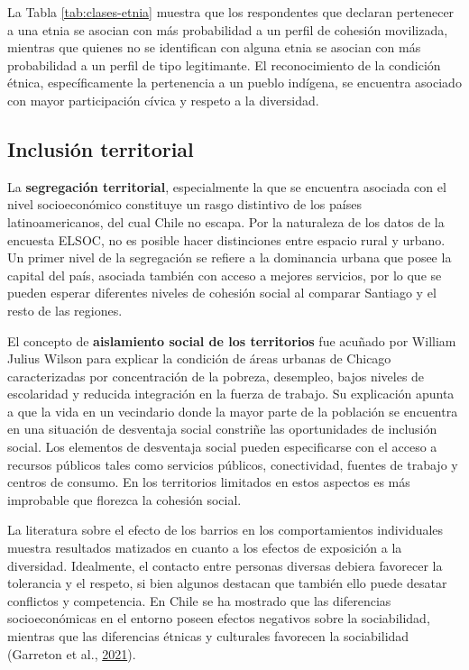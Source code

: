 \documentclass[
  12pt,
]{book}
\begin{document}
La Tabla \ref{tab:clases-etnia} muestra que los respondentes que declaran pertenecer a una etnia se asocian con más probabilidad a un perfil de cohesión movilizada, mientras que quienes no se identifican con alguna etnia se asocian con más probabilidad a un perfil de tipo legitimante. El reconocimiento de la condición étnica, específicamente la pertenencia a un pueblo indígena, se encuentra asociado con mayor participación cívica y respeto a la diversidad.

\hypertarget{inclusiuxf3n-territorial}{%
\subsection{Inclusión territorial}\label{inclusiuxf3n-territorial}}

La \textbf{segregación territorial}, especialmente la que se encuentra asociada con el nivel socioeconómico constituye un rasgo distintivo de los países latinoamericanos, del cual Chile no escapa. Por la naturaleza de los datos de la encuesta ELSOC, no es posible hacer distinciones entre espacio rural y urbano. Un primer nivel de la segregación se refiere a la dominancia urbana que posee la capital del país, asociada también con acceso a mejores servicios, por lo que se pueden esperar diferentes niveles de cohesión social al comparar Santiago y el resto de las regiones.

El concepto de \textbf{aislamiento social de los territorios} fue acuñado por William Julius Wilson para explicar la condición de áreas urbanas de Chicago caracterizadas por concentración de la pobreza, desempleo, bajos niveles de escolaridad y reducida integración en la fuerza de trabajo. Su explicación apunta a que la vida en un vecindario donde la mayor parte de la población se encuentra en una situación de desventaja social constriñe las oportunidades de inclusión social. Los elementos de desventaja social pueden especificarse con el acceso a recursos públicos tales como servicios públicos, conectividad, fuentes de trabajo y centros de consumo. En los territorios limitados en estos aspectos es más improbable que florezca la cohesión social.

La literatura sobre el efecto de los barrios en los comportamientos individuales muestra resultados matizados en cuanto a los efectos de exposición a la diversidad. Idealmente, el contacto entre personas diversas debiera favorecer la tolerancia y el respeto, si bien algunos destacan que también ello puede desatar conflictos y competencia. En Chile se ha mostrado que las diferencias socioeconómicas en el entorno poseen efectos negativos sobre la sociabilidad, mientras que las diferencias étnicas y culturales favorecen la sociabilidad (Garreton et al., \protect\hyperlink{ref-garreton_social_2021}{2021}).
\end{document}
